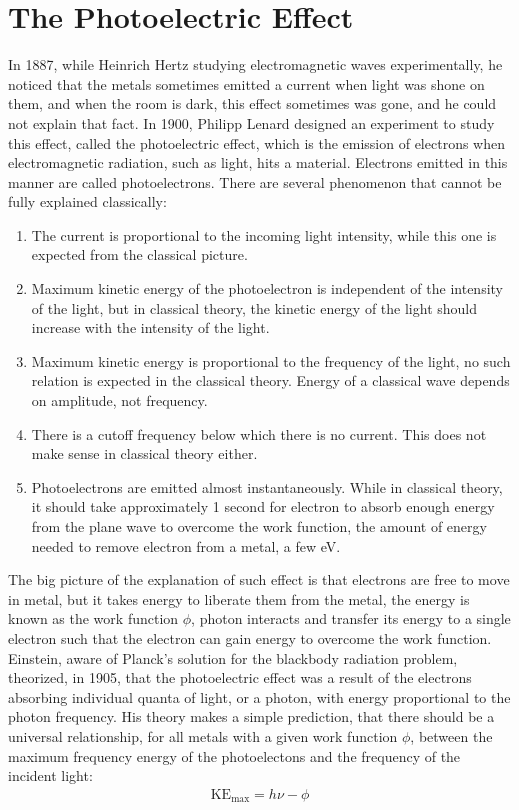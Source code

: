 \documentclass[11pt]{article}
\theoremstyle{break}
\theoremstyle{break}
\begin{document}
\section{The Photoelectric Effect}
In 1887, while Heinrich Hertz studying electromagnetic waves experimentally, he noticed that the metals sometimes emitted a current when light was shone on them, and when the room is dark, this effect sometimes was gone, and he could not explain that fact. In 1900, Philipp Lenard designed an experiment to study this effect, called the photoelectric effect, which is the emission of electrons when electromagnetic radiation, such as light, hits a material. Electrons emitted in this manner are called photoelectrons. There are several phenomenon that cannot be fully explained classically:
\begin{enumerate}
\item The current is proportional to the incoming light intensity, while this one is expected from the classical picture.
\item Maximum kinetic energy of the photoelectron is independent of the intensity of the light, but in classical theory, the kinetic energy of the light should increase with the intensity of the light. 
\item Maximum kinetic energy is proportional to the frequency of the light, no such relation is expected in the classical theory. Energy of a classical wave depends on amplitude, not frequency. 
\item There is a cutoff frequency below which there is no current. This does not make sense in classical theory either.
\item Photoelectrons are emitted almost instantaneously. While in classical theory, it should take approximately 1 second for electron to absorb enough energy from the plane wave to overcome the work function, the amount of energy needed to remove electron from a metal, a few eV.
\end{enumerate}
The big picture of the explanation of  such effect is that electrons are free to move in metal, but it takes energy to liberate them from the metal, the energy is known as the work function $\phi$, photon interacts and transfer its energy to a single electron such that the electron can gain energy to overcome the work function. Einstein, aware of Planck's solution for the blackbody radiation problem, theorized, in 1905, that the photoelectric effect was a result of the electrons absorbing individual quanta of light, or a photon, with energy proportional to the photon frequency. His theory makes a simple prediction, that there should be a universal relationship, for all metals with a given work function $\phi$, between the maximum frequency energy of the photoelectons and the frequency of the incident light:
\begin{align}
\text{KE}_{\text{max}} = h \nu - \phi
\end{align}
\end{document}
